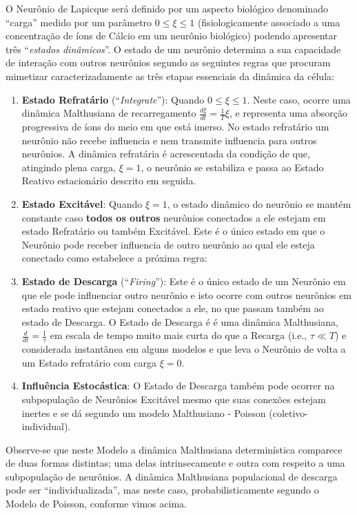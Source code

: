     O Neurônio de Lapicque será definido por um aspecto biológico denominado ``carga'' medido por um parâmetro \(0 \le \xi \le 1\) (fisiologicamente associado a uma concentração de íons de Cálcio em um neurônio biológico) podendo apresentar três ``\textit{estados dinâmicos}''. O estado de um neurônio determina a sua capacidade de interação com outros neurônios segundo as seguintes regras que procuram mimetizar caracterizadamente as três etapas essenciais da dinâmica da célula:
    \begin{enumerate}
    \item \textbf{Estado Refratário} (``\textit{Integrate}''): Quando \(0 \le \xi \le 1\). Neste caso, ocorre uma dinâmica Malthusiana de recarregamento \(\frac{d\xi}{dt} = \frac{1}{T}\xi\), e representa uma absorção progressiva de íons do meio em que está imerso. No estado refratário um neurônio não recebe influencia e nem transmite influencia para outros neurônios. A dinâmica refratária é acrescentada da condição de que, atingindo plena carga, \(\xi = 1\), o neurônio se estabiliza e passa ao Estado Reativo estacionário descrito em seguida.
    \item \textbf{Estado Excitável}: Quando \(\xi = 1\), o estado dinâmico do neurônio se mantém constante caso \textbf{todos os outros} neurônios conectados a ele estejam em estado Refratário ou também Excitável. Este é o único estado em que o Neurônio pode receber influencia de outro neurônio ao qual ele esteja conectado como estabelece a próxima regra:
    \item \textbf{Estado de Descarga} (``\textit{Firing}''): Este é o único estado de um Neurônio em que ele pode influenciar outro neurônio e isto ocorre com outros neurônios em estado reativo que estejam conectados a ele, no que passam também ao estado de Descarga. O Estado de Descarga é é uma dinâmica Malthusiana, \(\frac{d}{dt} = \frac{1}{\tau}\) em escala de tempo muito mais curta do que a Recarga (i.e., \(\tau \ll T\)) e considerada instantânea em alguns modelos e que leva o Neurônio de volta a um Estado refratário com carga \(\xi = 0\).
    \item \textbf{Influência Estocástica}: O Estado de Descarga também pode ocorrer na subpopulação de Neurônios Excitável mesmo que suas conexões estejam inertes e se dá segundo um modelo Malthusiano - Poisson (coletivo-individual).
    \end{enumerate}

    Observe-se que neste Modelo a dinâmica Malthusiana determinística comparece de duas formas distintas; uma delas intrinsecamente e outra com respeito a uma subpopulação de neurônios. A dinâmica Malthusiana populacional de descarga pode ser ``individualizada'', mas neste caso, probabilisticamente segundo o Modelo de Poisson, conforme vimos acima. 

